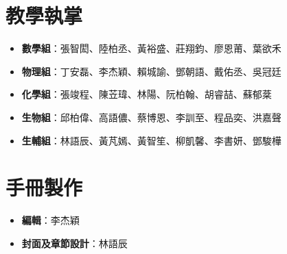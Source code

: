 \section{教學執掌}
\begin{itemize}
\item \textbf{數學組}：張智閎、陸柏丞、黃裕盛、莊翔鈞、廖恩莆、葉欲禾
\item \textbf{物理組}：丁安磊、李杰穎、賴城諭、鄧朝語、戴佑丞、吳冠廷
\item \textbf{化學組}：張竣程、陳苙瑋、林陽、阮柏翰、胡睿喆、蘇郁棻
\item \textbf{生物組}：邱柏偉、高語儂、蔡博恩、李訓至、程品奕、洪嘉聲
\item \textbf{生輔組}：林語辰、黃芃嫣、黃智笙、柳凱馨、李書妍、鄧駿樺
\end{itemize}

\section{手冊製作}
\begin{itemize}
\item \textbf{編輯}：李杰穎
\item \textbf{封面及章節設計}：林語辰
\end{itemize}

